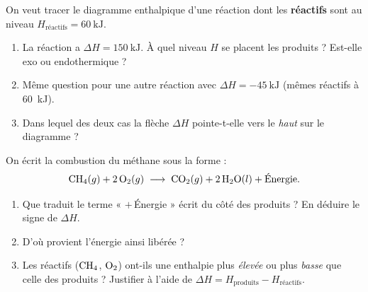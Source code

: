 \documentclass[11pt,a4paper]{article}
\newcommand{\dH}{\Delta H}
\begin{document}
\begin{exercice}
On veut tracer le diagramme enthalpique d'une réaction dont les \textbf{réactifs} sont au niveau
$H_{\text{réactifs}} = \SI{60}{\kilo\joule}$.
\begin{enumerate}[label=\alph*),leftmargin=2em,topsep=2pt,itemsep=2pt]
  \item La réaction a $\dH = \SI{+150}{\kilo\joule}$. À quel niveau $H$ se placent les produits ?
        Est-elle exo ou endothermique ?
  \item Même question pour une autre réaction avec $\dH = \SI{-45}{\kilo\joule}$ (mêmes réactifs à \SI{60}{\kilo\joule}).
  \item Dans lequel des deux cas la flèche $\dH$ pointe-t-elle vers le \emph{haut} sur le diagramme ?
\end{enumerate}
\end{exercice}

\begin{exercice}
On écrit la combustion du méthane sous la forme :
\[ \ce{CH4}(g) + 2\,\ce{O2}(g) \;\longrightarrow\; \ce{CO2}(g) + 2\,\ce{H2O}(l) + \text{Énergie}. \]
\begin{enumerate}[label=\alph*),leftmargin=2em,topsep=2pt,itemsep=2pt]
  \item Que traduit le terme « $+\,$Énergie » écrit du côté des produits ? En déduire le signe de $\dH$.
  \item D'où provient l'énergie ainsi libérée ?
  \item Les réactifs ($\ce{CH4}$, $\ce{O2}$) ont-ils une enthalpie plus \emph{élevée} ou plus \emph{basse}
        que celle des produits ? Justifier à l'aide de $\dH = H_{\text{produits}} - H_{\text{réactifs}}$.
\end{enumerate}
\end{exercice}
\end{document}
